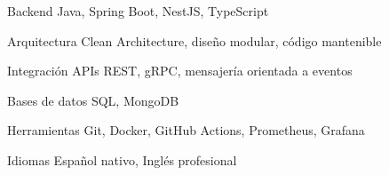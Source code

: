 

\begin{cvskills}

  \cvskill
    {Backend}
    {Java, Spring Boot, NestJS, TypeScript}

  \cvskill
    {Arquitectura}
    {Clean Architecture, diseño modular, código mantenible}

  \cvskill
    {Integración}
    {APIs REST, gRPC, mensajería orientada a eventos}

  \cvskill
    {Bases de datos}
    {SQL, MongoDB}

  \cvskill
    {Herramientas}
    {Git, Docker, GitHub Actions, Prometheus, Grafana}

  \cvskill
    {Idiomas}
    {Español nativo, Inglés profesional}

\end{cvskills}
